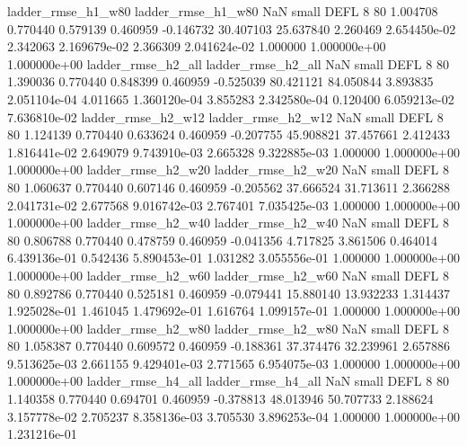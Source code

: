       ladder_rmse_h1_w80       ladder_rmse_h1_w80                   NaN      small     DEFL                 8 80 1.004708       0.770440 0.579139       0.460959   -0.146732     30.407103     25.637840     2.260469   2.654450e-02  2.342063 2.169679e-02     2.366309   2.041624e-02            1.000000    1.000000e+00        1.000000e+00
      ladder_rmse_h2_all       ladder_rmse_h2_all                   NaN      small     DEFL                 8 80 1.390036       0.770440 0.848399       0.460959   -0.525039     80.421121     84.050844     3.893835   2.051104e-04  4.011665 1.360120e-04     3.855283   2.342580e-04            0.120400    6.059213e-02        7.636810e-02
      ladder_rmse_h2_w12       ladder_rmse_h2_w12                   NaN      small     DEFL                 8 80 1.124139       0.770440 0.633624       0.460959   -0.207755     45.908821     37.457661     2.412433   1.816441e-02  2.649079 9.743910e-03     2.665328   9.322885e-03            1.000000    1.000000e+00        1.000000e+00
      ladder_rmse_h2_w20       ladder_rmse_h2_w20                   NaN      small     DEFL                 8 80 1.060637       0.770440 0.607146       0.460959   -0.205562     37.666524     31.713611     2.366288   2.041731e-02  2.677568 9.016742e-03     2.767401   7.035425e-03            1.000000    1.000000e+00        1.000000e+00
      ladder_rmse_h2_w40       ladder_rmse_h2_w40                   NaN      small     DEFL                 8 80 0.806788       0.770440 0.478759       0.460959   -0.041356      4.717825      3.861506     0.464014   6.439136e-01  0.542436 5.890453e-01     1.031282   3.055556e-01            1.000000    1.000000e+00        1.000000e+00
      ladder_rmse_h2_w60       ladder_rmse_h2_w60                   NaN      small     DEFL                 8 80 0.892786       0.770440 0.525181       0.460959   -0.079441     15.880140     13.932233     1.314437   1.925028e-01  1.461045 1.479692e-01     1.616764   1.099157e-01            1.000000    1.000000e+00        1.000000e+00
      ladder_rmse_h2_w80       ladder_rmse_h2_w80                   NaN      small     DEFL                 8 80 1.058387       0.770440 0.609572       0.460959   -0.188361     37.374476     32.239961     2.657886   9.513625e-03  2.661155 9.429401e-03     2.771565   6.954075e-03            1.000000    1.000000e+00        1.000000e+00
      ladder_rmse_h4_all       ladder_rmse_h4_all                   NaN      small     DEFL                 8 80 1.140358       0.770440 0.694701       0.460959   -0.378813     48.013946     50.707733     2.188624   3.157778e-02  2.705237 8.358136e-03     3.705530   3.896253e-04            1.000000    1.000000e+00        1.231216e-01
